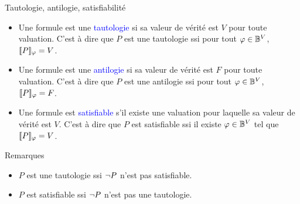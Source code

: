 \documentclass[10pt]{beamer}
\begin{document}
\begin{frame}{\Ctitle}{\stitle}
	\begin{alertblock}{Tautologie, antilogie, satisfiabilité}
		\begin{itemize}
			\item Une formule est une \textcolor{blue}{tautologie} si sa valeur de vérité est $V$ pour toute valuation. C'est à dire que $P$ est une tautologie ssi pour tout $\varphi \in \mathbb{B}^V$, $\llbracket P \rrbracket_{\varphi} = V$.
			\item<2-> Une formule est une \textcolor{blue}{antilogie} si sa valeur de vérité est $F$ pour toute valuation. C'est à dire que $P$ est une antilogie ssi pour tout $\varphi \in \mathbb{B}^V$, $\llbracket P \rrbracket_{\varphi} = F$.
			\item<3-> Une formule est \textcolor{blue}{satisfiable} s'il existe une valuation pour laquelle sa valeur de vérité est $V$. C'est à dire que $P$ est satisfiable ssi il existe $\varphi \in \mathbb{B}^V$ tel que $\llbracket P \rrbracket_{\varphi} = V$.
		\end{itemize}
	\end{alertblock}
	{\begin{block}{Remarques}
			\begin{itemize}
				\item<4-> $P$ est une tautologie ssi $\neg P$ n'est pas satisfiable.
				\item<5-> $P$ est satisfiable ssi $\neg P$ n'est pas une tautologie.
			\end{itemize}
		\end{block}}
\end{frame}
\end{document}
